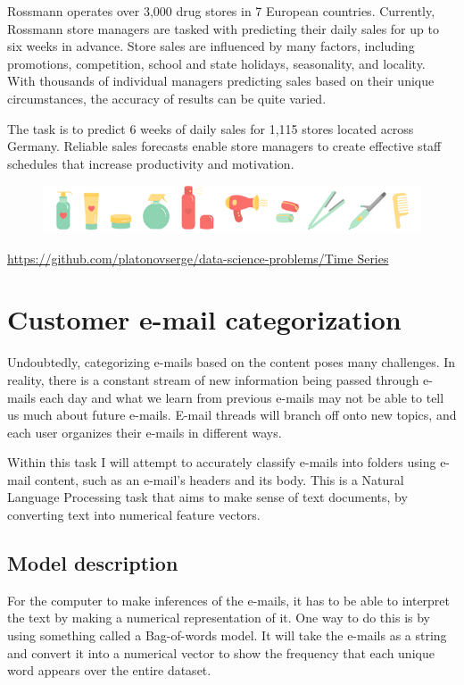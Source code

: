 \documentclass[11pt,fleqn]{book} %
\begin{document}
\begin{remark}
Rossmann operates over 3,000 drug stores in 7 European countries. Currently, Rossmann store managers are tasked with predicting their daily sales for up to six weeks in advance. Store sales are influenced by many factors, including promotions, competition, school and state holidays, seasonality, and locality. With thousands of individual managers predicting sales based on their unique circumstances, the accuracy of results can be quite varied.

The task is to predict 6 weeks of daily sales for 1,115 stores located across Germany. Reliable sales forecasts enable store managers to create effective staff schedules that increase productivity and motivation. 
\begin{figure}[h]
\center
\includegraphics[width=0.8\linewidth]{Pictures/rossmann.png}
\end{figure}
\end{remark}
\url{https://github.com/platonovserge/data-science-problems/Time Series }

\chapter{Customer e-mail categorization}

Undoubtedly, categorizing e-mails based on the content poses many challenges. In reality, there is a constant stream of new information being passed through e-mails each day and what we learn from previous e-mails may not be able to tell us much about future e-mails. E-mail threads will branch off onto new topics, and each user organizes their e-mails in different ways. 

Within this task I will attempt to accurately classify e-mails into folders using e-mail content, such as an e-mail's headers and its body. This is a Natural Language Processing task that aims to make sense of text documents, by converting text into numerical feature vectors.

\section{Model description}
For the computer to make inferences of the e-mails, it has to be able to interpret the text by making a numerical representation of it. One way to do this is by using something called a Bag-of-words model. It will take the e-mails as a string and convert it into a numerical vector to show the frequency that each unique word appears over the entire dataset.
\end{document}
